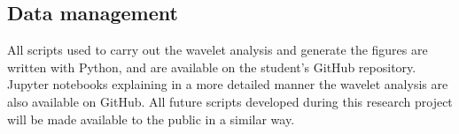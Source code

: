 \documentclass[main.tex]{subfiles}
\begin{document}
\subsection{Data management}

All scripts used to carry out the wavelet analysis and generate the figures are written with Python, and are available on the student's GitHub repository. Jupyter notebooks explaining in a more detailed manner the wavelet analysis are also available on GitHub. All future scripts developed during this research project will be made available to the public in a similar way.
\end{document}
